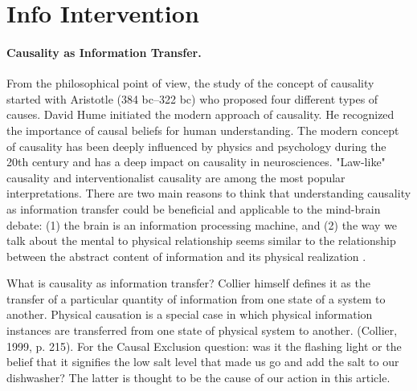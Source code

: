 \section{Info Intervention} 
\label{sec:info}


 
\paragraph{ Causality as Information Transfer.}  From the philosophical point of view, the study of the concept of causality started with Aristotle (384 bc–322 bc) who proposed four different types of causes. David Hume initiated the modern approach of causality. He recognized the importance of causal beliefs for human understanding. The modern concept of causality has been deeply influenced by physics and psychology during the 20th century and has a deep impact on causality in neurosciences. "Law-like" causality and interventionalist causality are among the most popular interpretations. There are two main reasons to think that understanding causality as information transfer could be beneficial and applicable to the mind-brain debate: (1) the brain is an information processing machine, and (2) the way we talk about the mental to physical relationship seems similar to the relationship between the abstract content of information and its physical realization \cite{feltz2019free}.

What is causality as information transfer? Collier himself defines it as the transfer of a particular quantity of information from one state of a system to another. Physical causation is a special case in which physical information instances are transferred from one state of physical system to another. (Collier, 1999, p. 215). For the Causal Exclusion question: was it the flashing light or the belief that it signifies the low salt level that made us go and add the salt to our dishwasher? {{The latter is thought to be the cause of our action in this article}}.

